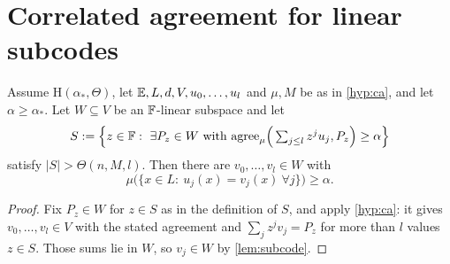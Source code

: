 \section{Correlated agreement for linear subcodes}

\begin{consequence}\label{cor:share}
Assume $\mathrm H(\alpha_*,\Theta)$, let $\mathbb{E},L,d,V,u_0,\dots,u_l$ and $\mu,M$ be as in
\cref{hyp:ca}, and let $\alpha\ge\alpha_*$. Let $W\subseteq V$ be an $\mathbb{F}$-linear subspace and let
\[
S:=\Big\{z\in\F:\ \exists P_z\in W\ \text{with}\ \agree_\mu\Big(\textstyle\sum_{j\le l}z^ju_j,P_z\Big)\ge\alpha\Big\}
\]
satisfy $|S|>\Theta(n,M,l)$. Then there are $v_0,\dots,v_l\in W$ with
\[
\mu\big(\{x\in L:\ u_j(x)=v_j(x)\ \forall j\}\big)\ge\alpha .
\]
\end{consequence}

\begin{proof}
Fix $P_z\in W$ for $z\in S$ as in the definition of $S$, and apply \cref{hyp:ca}: it gives
$v_0,\dots,v_l\in V$ with the stated agreement and $\sum_jz^jv_j=P_z$ for more than $l$ values
$z\in S$. Those sums lie in $W$, so $v_j\in W$ by \cref{lem:subcode}.
\end{proof}
